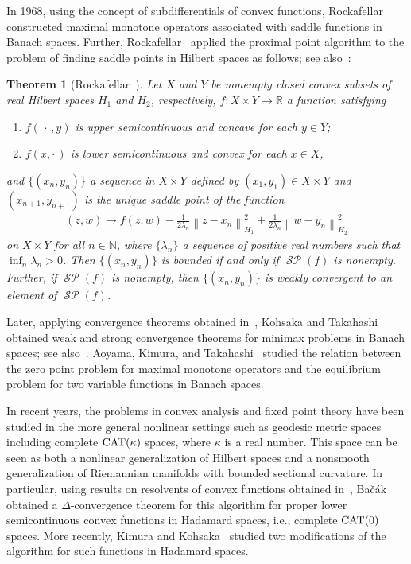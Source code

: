 \documentclass[draft]{amsart}
\numberwithin{equation}{section}
\def\N{\mathbb N}
\def\R{\mathbb R}
\providecommand{\norm}[1]{\left\lVert#1\right\rVert}
\DeclareMathOperator{\Saddle}{\mathcal{SP}}
\newcommand{\CAT}{\textup{CAT}}
\theoremstyle{plain}
\newtheorem{theorem}{Theorem}[section]
\theoremstyle{definition}
\theoremstyle{remark}
\begin{document}
In 1968, using the concept of subdifferentials of 
convex functions, Rockafellar~\cite{MR0285942} constructed 
maximal monotone operators associated with 
saddle functions in Banach spaces. 
Further, Rockafellar~\cite{MR0410483} applied the proximal point algorithm to 
the problem of finding saddle points in Hilbert spaces 
as follows; see also~\cite{MR2548424}: 
\begin{theorem}[Rockafellar~\cite{MR0410483}]
\label{thm:Rockafellar-ppa-saddle}
 Let $X$ and $Y$ be nonempty closed convex subsets of 
 real Hilbert spaces $H_1$ and $H_2$, respectively, 
 $f\colon X\times Y\to \R$ a function satisfying 
 \begin{enumerate}
  \item[(i)] $f(\,\cdot\,,y)$ is upper semicontinuous 
 and concave for each $y\in Y$; 
  \item[(ii)] $f(x,\cdot \,)$ is lower semicontinuous 
 and convex for each $x\in X$, 
 \end{enumerate} 
 and $\{(x_n,y_n)\}$ a sequence in $X\times Y$ defined by 
 $(x_1,y_1)\in X\times Y$ and $(x_{n+1},y_{n+1})$ 
 is the unique saddle point of the function 
 \begin{align}
  (z,w)\mapsto f(z,w) -\frac{1}{2\lambda_n}\norm{z-x_n}_{H_1}^2
+\frac{1}{2\lambda_n}\norm{w-y_n}_{H_2}^2
 \end{align}
on $X\times Y$ for all $n\in \N$, 
where $\{\lambda_n\}$ a sequence of positive real numbers such that 
 $\inf_{n}\lambda_n >0$. Then 
$\{(x_n,y_n)\}$ is bounded if and only if $\Saddle (f)$ 
is nonempty. Further, if $\Saddle (f)$ is nonempty, then 
$\{(x_n,y_n)\}$ is weakly convergent to an element of 
$\Saddle (f)$. 
\end{theorem}

Later, applying convergence theorems 
obtained in~\cites{MR2058504, MR2112848}, 
Kohsaka and Takahashi~\cite{MR2144044} obtained 
weak and strong convergence theorems for 
minimax problems in Banach spaces; 
see also~\cites{MR3013139, MR2548424}.  
Aoyama, Kimura, and Takahashi~\cite{MR2422998} 
studied the relation between 
the zero point problem for maximal monotone operators and 
the equilibrium problem for two variable functions in Banach spaces. 

In recent years, the problems in convex analysis and fixed point theory 
have been studied in the more general nonlinear settings 
such as geodesic metric spaces including complete $\CAT(\kappa)$ spaces, where 
$\kappa$ is a real number. This space can be seen as 
both a nonlinear generalization of Hilbert spaces 
and a nonsmooth generalization of Riemannian manifolds 
with bounded sectional curvature. 
In particular, using results on resolvents of convex functions 
obtained in~\cites{MR1360608, MR1651416}, 
Ba{\v{c}}{\'a}k~\cite{MR3047087} obtained a $\Delta$-convergence 
theorem for this algorithm for proper lower semicontinuous convex 
functions in Hadamard spaces, i.e., complete $\CAT(0)$ spaces. 
More recently, Kimura and Kohsaka~\cite{MR3574140} studied two 
modifications of the algorithm for such functions in Hadamard spaces. 
\end{document}
